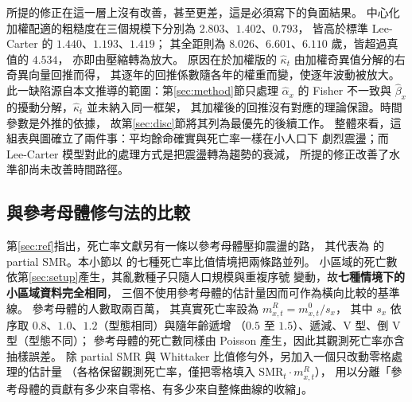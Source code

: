 \documentclass[UTF8, fontset=macnew, a4paper, 12pt]{ctexart}
\begin{document}
所提的修正在這一層上沒有改善，甚至更差，這是必須寫下的負面結果。
中心化加權配適的粗糙度在三個規模下分別為 $2.803$、$1.402$、$0.793$，
皆高於標準 Lee-Carter 的 $1.440$、$1.193$、$1.419$；
其全距則為 $8.026$、$6.601$、$6.110$ 歲，皆超過真值的 $4.534$，
亦即由壓縮轉為放大。
原因在於加權版的 $\hat\kappa_t$ 由加權奇異值分解的右奇異向量回推而得，
其逐年的回推係數隨各年的權重而變，使逐年波動被放大。
此一缺陷源自本文推導的範圍：第\ref{sec:method}節只處理 $\hat\alpha_x$ 的
Fisher 不一致與 $\hat\beta_x$ 的擾動分解，$\hat\kappa_t$ 並未納入同一框架，
其加權後的回推沒有對應的理論保證。時間參數是外推的依據，
故第\ref{sec:disc}節將其列為最優先的後續工作。
整體來看，這組表與圖確立了兩件事：平均餘命確實與死亡率一樣在小人口下
劇烈震盪；而 Lee-Carter 模型對此的處理方式是把震盪轉為趨勢的衰減，
所提的修正改善了水準卻尚未改善時間路徑。

\subsection{與參考母體修勻法的比較}\label{sec:smr}

第\ref{sec:ref}指出，死亡率文獻另有一條以參考母體壓抑震盪的路，
其代表為 \citet{lee2003}的 partial SMR。本小節以 \citet[Figure 2]{yue2019}
的七種死亡率比值情境把兩條路並列。
小區域的死亡數依第\ref{sec:setup}產生，其亂數種子只隨人口規模與重複序號
變動，故\textbf{七種情境下的小區域資料完全相同}，
三個不使用參考母體的估計量因而可作為橫向比較的基準線。
參考母體的人數取兩百萬，
其真實死亡率設為 $m^{R}_{x,t}=m^{0}_{x,t}/s_x$，
其中 $s_x$ 依序取 $0.8$、$1.0$、$1.2$（型態相同）與隨年齡遞增
（$0.5$ 至 $1.5$）、遞減、V 型、倒 V 型（型態不同）；
參考母體的死亡數同樣由 Poisson 產生，因此其觀測死亡率亦含抽樣誤差。
除 partial SMR 與 Whittaker 比值修勻外，另加入一個只改動零格處理的估計量
（各格保留觀測死亡率，僅把零格填入 $\mathrm{SMR}_t\cdot m^{R}_{x,t}$），
用以分離「參考母體的貢獻有多少來自零格、有多少來自整條曲線的收縮」。
\end{document}
